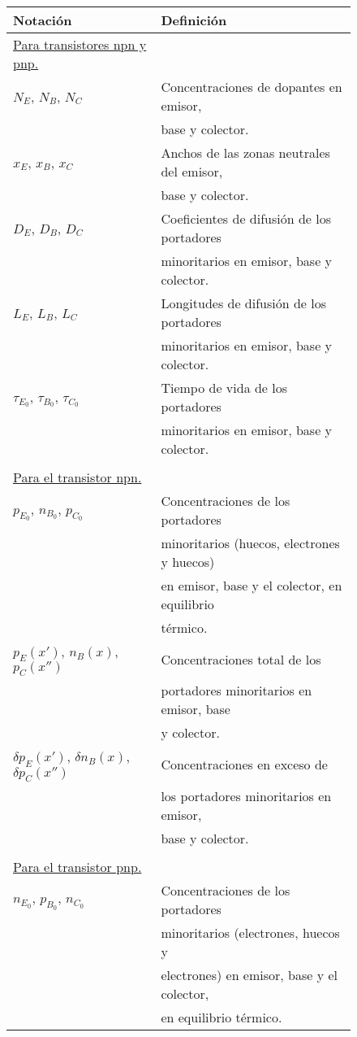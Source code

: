 \documentclass[12pt,a4paper]{article}
\begin{document}
\begin{figure}[ht!]
\begin{center}
\begin{tabular}{|ll|} \hline
\textbf{Notación} & \textbf{Definición} \\ \hline
\underline{Para transistores npn y pnp.} & \\
$N_{E}$, $N_{B}$, $N_{C}$ & Concentraciones de dopantes en emisor, \\ & base y colector.\\
$x_{E}$, $x_{B}$, $x_{C}$ & Anchos de las zonas neutrales del emisor, \\ & base y colector.\\
$D_{E}$, $D_{B}$, $D_{C}$ & Coeficientes de difusión de los portadores \\  & minoritarios en emisor, base y colector.\\
$L_{E}$, $L_{B}$, $L_{C}$ & Longitudes de difusión de los portadores \\  & minoritarios en emisor, base y colector.\\
$\tau _{E_{0}}$, $\tau _{B_{0}}$, $\tau _{C_{0}}$ & Tiempo de vida de los portadores \\ & minoritarios en emisor, base y colector.\\
 & \\
\underline{Para el transistor npn.} & \\
$p_{E_{0}}$, $n_{B_{0}}$, $p_{C_{0}}$ & Concentraciones de los portadores \\ & minoritarios (huecos, electrones y huecos) \\ & en emisor, base y el colector, en equilibrio \\ & térmico. \\
$p_{E}(x')$, $n_{B}(x)$, $p_{C}(x'')$ & Concentraciones total de los \\ & portadores minoritarios en emisor, base \\ & y colector. \\
$\delta p_{E}(x')$, $\delta n_{B}(x)$, $\delta p_{C}(x'')$ & Concentraciones en exceso de \\ & los portadores minoritarios en emisor, \\ & base y colector. \\
 & \\
\underline{Para el transistor pnp.} & \\
$n_{E_{0}}$, $p_{B_{0}}$, $n_{C_{0}}$ & Concentraciones de los portadores \\ & minoritarios (electrones, huecos y \\ & electrones) en emisor, base y el colector, \\ & en equilibrio térmico. \\

\end{tabular}
\end{center}
\end{figure}
\end{document}
